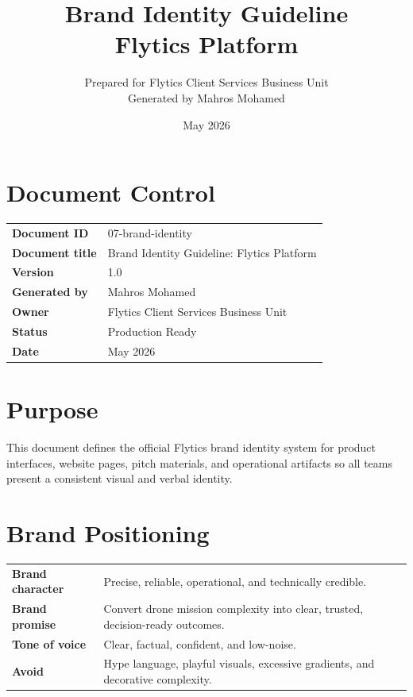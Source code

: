 \documentclass[11pt,a4paper]{article}
\title{\textbf{Brand Identity Guideline\\Flytics Platform}}
\author{Prepared for Flytics Client Services Business Unit\\Generated by Mahros Mohamed}
\date{May 2026}
\begin{document}
\maketitle
\section*{Document Control}
\begin{longtable}{>{\bfseries}p{}p{}}
\toprule
Document ID & 07-brand-identity \\
Document title & Brand Identity Guideline: Flytics Platform \\
Version & 1.0 \\
Generated by & Mahros Mohamed \\
Owner & Flytics Client Services Business Unit \\
Status & Production Ready \\
Date & May 2026 \\
\bottomrule
\end{longtable}

\renewcommand{\contentsname}{Contents}
\tableofcontents
\newpage

\section*{Purpose}

This document defines the official Flytics brand identity system for product interfaces, website pages, pitch materials, and operational artifacts so all teams present a consistent visual and verbal identity.

\section{Brand Positioning}

\begin{longtable}{>{\bfseries}p{}p{}}
\toprule
Brand character & Precise, reliable, operational, and technically credible. \\
Brand promise & Convert drone mission complexity into clear, trusted, decision-ready outcomes. \\
Tone of voice & Clear, factual, confident, and low-noise. \\
Avoid & Hype language, playful visuals, excessive gradients, and decorative complexity. \\
\bottomrule
\end{longtable}
\end{document}
